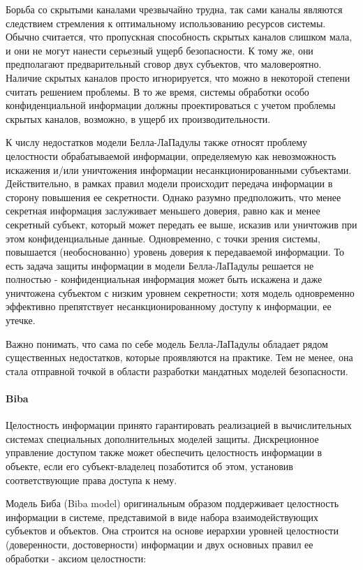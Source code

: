 Борьба со скрытыми каналами чрезвычайно трудна, так сами каналы являются следствием стремления к оптимальному использованию ресурсов системы. Обычно считается, что пропускная способность скрытых каналов слишком мала, и они не могут нанести серьезный ущерб безопасности. К тому же, они предполагают предварительный сговор двух субъектов, что маловероятно. Наличие скрытых каналов просто игнорируется, что можно в некоторой степени считать решением проблемы. В то же время, системы обработки особо конфиденциальной информации должны проектироваться с учетом проблемы скрытых каналов, возможно, в ущерб их производительности. 

К числу недостатков модели Белла-ЛаПадулы также относят проблему целостности обрабатываемой информации, определяемую как невозможность искажения и/или уничтожения информации несанкционированными субъектами. Действительно, в рамках правил модели происходит передача информации в сторону повышения ее секретности. Однако разумно предположить, что менее секретная информация заслуживает меньшего доверия, равно как и менее секретный субъект, который может передать ее выше, исказив или уничтожив при этом конфиденциальные данные. Одновременно, с точки зрения системы, повышается (необоснованно) уровень доверия к передаваемой информации. То есть задача защиты информации в модели Белла-ЛаПадулы решается не полностью - конфиденциальная информация может быть искажена и даже уничтожена субъектом с низким уровнем секретности; хотя модель одновременно эффективно препятствует несанкционированному доступу к информации, ее утечке. 

Важно понимать, что сама по себе модель Белла-ЛаПадулы обладает рядом существенных недостатков,  которые проявляются на практике. Тем не менее, она стала отправной точкой в области разработки мандатных моделей безопасности.

\paragraph{Biba}

Целостность информации принято гарантировать реализацией в вычислительных системах специальных дополнительных моделей защиты. Дискреционное управление доступом также может обеспечить целостность информации в объекте, если его субъект-владелец позаботится об этом, установив соответствующие права доступа к нему. 

Модель Биба (Biba model) оригинальным образом поддерживает целостность информации в системе, представимой в виде набора взаимодействующих субъектов и объектов. Она строится на основе иерархии уровней целостности (доверенности, достоверности) информации и двух основных правил ее обработки - аксиом целостности: 

